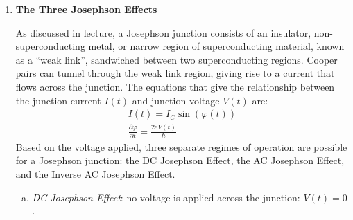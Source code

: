 \documentclass[10pt,letterpaper]{article}
\begin{document}
\begin{enumerate}
\begin{enumerate}[a)]
\begin{enumerate}[a)]
\item Calculate $n$ (in cm$^{-3}$) for \textit{n-type} Si and GaN at $T = 300$K when $E_{C} - E_{F} = 0.1$ eV

\color{violet}
For silicon
\begin{gather*}
n = \num{3.22e19} e^{\frac{-0.1}{k_{B}T}} = \num{6.728e17}
\end{gather*}
For gallium nitride
\begin{gather*}
n = \num{1.82e19}e^{\frac{-0.1}{k_{B}T}} = \num{3.803e17}
\end{gather*}
\color{black}

\item Calculate $p$ (in cm$^{-3}$) for \textit{p-type} Si and GaN at $T = 300$K when $E_{F} - E_{V} = 0.2$ eV. 

\color{violet}
For silicon
\begin{gather*}
p = \num{2.3e18}e^{\frac{-0.2}{k_{B}T}} = \num{1.004e15}
\end{gather*}
For gallium
\begin{gather*}
p = \num{4.6e19}e^{\frac{-0.2}{k_{B}T}} = \num{2.008e16}
\end{gather*}
\color{black}

\end{enumerate}

\end{enumerate}

\item \textbf{The Three Josephson Effects}

As discussed in lecture, a Josephson junction consists of an insulator, non-superconducting metal, or narrow region of superconducting material, known as a “weak link”, sandwiched between two superconducting regions. Cooper pairs can tunnel through the weak link region, giving rise to a current that flows across the junction. The equations that give the relationship between the junction current $I(t)$ and junction voltage $V(t)$ are:
\begin{gather*}
I(t) = I_{C}\sin(\varphi(t)) \\
\frac{\partial \varphi}{\partial t} = \frac{2eV(t)}{\hbar}
\end{gather*}
Based on the voltage applied, three separate regimes of operation are possible for a Josephson junction: the DC Josephson Effect, the AC Josephson Effect, and the Inverse AC Josephson Effect. 

\begin{enumerate}[a)]

\item \textit{DC Josephson Effect}: no voltage is applied across the junction: $V(t) = 0$.


\end{enumerate}
\end{enumerate}
\end{document}
